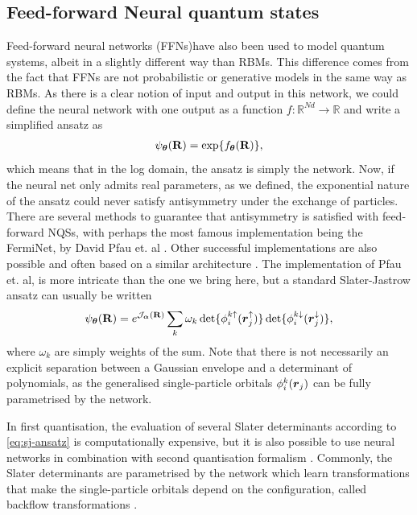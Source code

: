 \subsection{Feed-forward Neural quantum states}

Feed-forward neural networks (FFNs)have also been used to model quantum systems, albeit in a slightly different way than RBMs. This difference comes from the fact that FFNs are not probabilistic or generative models in the same way as RBMs. As there is a clear notion of input and output in this network, we could define the neural network with one output as a function $f: \mathbb{R}^{Nd} \to \mathbb{R}$ and write a simplified ansatz as
\begin{align}
    \psi_{\boldsymbol{\theta}}(\mathbf{R}) = \exp \{f_{\boldsymbol{\theta}}(\mathbf{R})\}\label{eq:ffn_trialwf},
\end{align}
which means that in the log domain, the ansatz is simply the network. Now, if the neural net only admits real parameters, as we defined, the exponential nature of the ansatz could never satisfy antisymmetry under the exchange of particles. There are several methods to guarantee that antisymmetry is satisfied with feed-forward NQSs, with perhaps the most famous implementation being the FermiNet, by David Pfau et. al  \cite{ferminet}. Other successful implementations are also possible and often based on a similar architecture \cite{lin2023explicitly, drissifermion}. The implementation of Pfau et. al, is more intricate than the one we bring here, but a standard Slater-Jastrow ansatz can usually be written
\begin{align}
    \psi_{\boldsymbol{\theta}}(\mathbf{R}) = e^{\mathcal{J}_{\boldsymbol{\alpha}} (\mathbf{R})}\sum_{k} \omega_k \det\{\phi^{k\uparrow}_i(\boldsymbol{r}_j^{\uparrow})\}\det\{\phi^{k\downarrow}_i(\boldsymbol{r}_j^{\downarrow})\},
    \label{eq:sj-ansatz}
\end{align}
where $\omega_k$ are simply weights of the sum. Note that there is not necessarily an explicit separation between a Gaussian envelope and a determinant of polynomials, as the generalised single-particle orbitals $\phi_i^k(\boldsymbol{r}_j)$ can be fully parametrised by the network. 

In first quantisation, the evaluation of several Slater determinants according to \eqref{eq:sj-ansatz} is computationally expensive, but it is also possible to use neural networks in combination with second quantisation formalism \cite{lange2024architectures}. Commonly, the Slater determinants are parametrised by the network which learn transformations that make the single-particle orbitals depend on the configuration, called backflow transformations \cite{holzmann2003backflow}.

